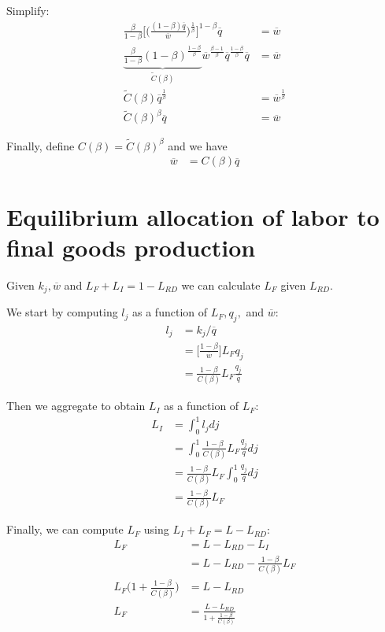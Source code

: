 \documentclass[12pt,english]{article}
\theoremstyle{remark}
\begin{document}
Simplify:
\begin{align*}
	\frac{\beta}{1-\beta} \Big[ \Big( \frac{(1-\beta) \overline{q}}{\overline{w}}\Big)^{\frac{1}{\beta}} \Big]^{1-\beta} \overline{q} &= \overline{w} \\
	\underbrace{\frac{\beta}{1-\beta} (1-\beta)^{\frac{1-\beta}{\beta}}}_{\tilde{C}(\beta)} \overline{w}^{\frac{\beta-1}{\beta}} \overline{q}^{\frac{1-\beta}{\beta}} \overline{q} &= \overline{w} \\
	\tilde{C}(\beta) \overline{q}^{\frac{1}{\beta}} &= \overline{w}^{\frac{1}{\beta}} \\
	\tilde{C}(\beta)^{\beta} \overline{q} &= \overline{w}
\end{align*}

Finally, define $C(\beta) = \tilde{C}(\beta)^{\beta}$ and we have
\begin{align*}
	\overline{w} &= C(\beta) \overline{q}
\end{align*}

\section{Equilibrium allocation of labor to final goods production}
Given $k_j,\overline{w}$ and $L_F + L_I  = 1 - L_{RD}$ we can calculate $L_F$ given $L_{RD}$. 

We start by computing $l_j$ as a function of $L_F, q_j,$ and $\overline{w}$:
\begin{align*}
	l_j &= k_j / \overline{q} \\
		&=  \Big[ \frac{1-\beta}{\overline{w}} \Big]L_F   q_j \\
		&= \frac{1-\beta}{C(\beta)} L_F \frac{q_j}{\overline{q}}
\end{align*}

Then we aggregate to obtain $L_I$ as a function of $L_F$:
\begin{align*}
	L_I &= \int_0^1 l_j dj \\
	    &= \int_0^1 \frac{1-\beta}{C(\beta)} L_F \frac{q_j}{\overline{q}} dj \\
	    &= \frac{1-\beta}{C(\beta)} L_F \int_0^1 \frac{q_j}{\overline{q}} dj \\
	    &= \frac{1-\beta}{C(\beta)} L_F 
\end{align*}

Finally, we can compute $L_F$ using $L_I + L_F = L - L_{RD}$: 
\begin{align*}
	L_F &= L - L_{RD} - L_I \\
	    &= L - L_{RD} - \frac{1-\beta}{C(\beta)} L_F \\
	L_F \Big( 1 +  \frac{1-\beta}{C(\beta)} \Big) &= L - L_{RD} \\
	L_F &= \frac{L - L_{RD}}{1 +  \frac{1-\beta}{C(\beta)}}
\end{align*}
\end{document}
